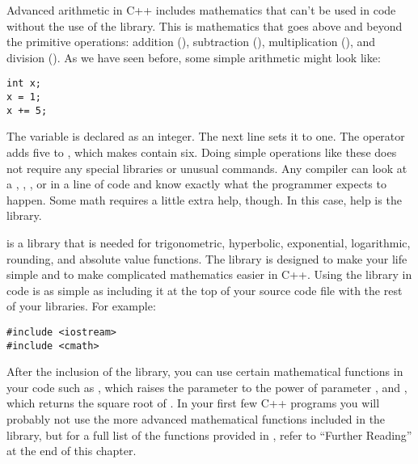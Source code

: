 
Advanced arithmetic in C++ includes mathematics that can't be used in code without the use of the  library. 
This is mathematics that goes above and beyond the primitive operations: addition (\Code{+}), subtraction (\Code{-}), multiplication (\Code{*}), and division (\Code{/}). 
As we have seen before, some simple arithmetic might look like:
	
\noindent\begin{minipage}{\linewidth}\begin{lstlisting}
int x;
x = 1;
x += 5;
\end{lstlisting}\end{minipage}

The variable  is declared as an integer. 
The next line sets it to one. 
The \Code{+=} operator adds five to , which makes  contain six.	
Doing simple operations like these does not require any special libraries or unusual commands. 
Any compiler can look at a \Code{+}, \Code{-}, \Code{*}, or \Code{/} in a line of code and know exactly what the programmer 
expects to happen. 
Some math requires a little extra help, though. 
In this case, help is the  library.
 
 is a library that is needed for trigonometric, hyperbolic, exponential, logarithmic, rounding, and absolute value functions. 
The  library is designed to make your life simple and to make complicated mathematics easier in C++. 
Using the  library in code is as simple as including it at the top of your source code file with the rest of your libraries. 
For example:

\noindent\begin{minipage}{\linewidth}\begin{lstlisting}
#include <iostream>	
#include <cmath>
\end{lstlisting}\end{minipage}

After the inclusion of the  library, you can use certain mathematical functions in your code such as , which raises the parameter  to the power of parameter , and , which returns the square root of . 
In your first few C++ programs you will probably not use the more advanced mathematical functions included in the  library, but for a full list of the functions provided in , refer to ``Further Reading'' at the end of this chapter. 

